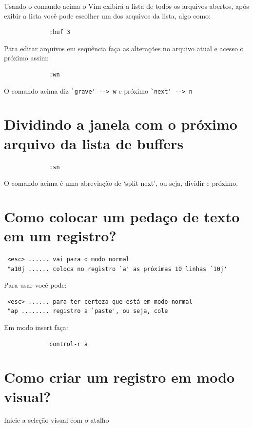 \documentclass[10pt,a4paper,openany]{book}
\begin{document}
Usando o comando acima o Vim exibirá a lista de todos os arquivos
abertos, após exibir a lista você pode escolher um dos arquivos da
lista, algo como:

\begin{verbatim}
			 :buf 3
\end{verbatim}

Para editar arquivos em sequência faça as alterações no arquivo atual
e acesso o próximo assim:

\begin{verbatim}
			 :wn
\end{verbatim}

O comando acima diz \verb|`grave' --> w|  e próximo \verb|`next' --> n|

\section{Dividindo a janela com o próximo arquivo da lista de buffers}
\label{Dividindo a janela com o próximo arquivo da lista de buffers}

\begin{verbatim}
			 :sn
\end{verbatim}

O comando acima é uma abreviação de `split next', ou seja, dividir e próximo.

\section{Como colocar um pedaço de texto em um registro?}
\label{Como colocar um pedaço de texto em um registro?}

\begin{verbatim}
 <esc> ...... vai para o modo normal
 "a10j ...... coloca no registro `a' as próximas 10 linhas `10j'
\end{verbatim}

Para usar você pode:

\begin{verbatim}
 <esc> ...... para ter certeza que está em modo normal
 "ap ........ registro a `paste', ou seja, cole
\end{verbatim}

Em modo insert faça:

\begin{verbatim}
			 control-r a
\end{verbatim}

\section{Como criar um registro em modo visual?}
\label{Como criar um registro em modo visual?}
Inicie a seleção visual com o atalho
\end{document}
